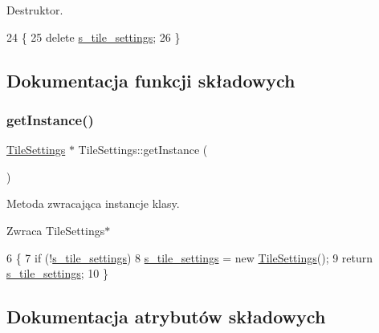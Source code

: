 Destruktor. 
\begin{DoxyCode}
24 \{
25     \textcolor{keyword}{delete} \mbox{\hyperlink{class_tile_settings_a4e06ef1c8909d1e22f82976b9b4162f0}{s\_tile\_settings}};
26 \}
\end{DoxyCode}


\subsection{Dokumentacja funkcji składowych}
\mbox{\label{class_tile_settings_a003ae6e78b97855c8592b2b4c0818914}} 
\subsubsection{\texorpdfstring{get\+Instance()}{getInstance()}}
{\footnotesize\ttfamily \mbox{\hyperlink{class_tile_settings}{Tile\+Settings}} $\ast$ Tile\+Settings\+::get\+Instance (\begin{DoxyParamCaption}{ }\end{DoxyParamCaption})\hspace{0.3cm}{\ttfamily [static]}}

Metoda zwracająca instancje klasy. \begin{DoxyReturn}{Zwraca}
Tile\+Settings$\ast$ 
\end{DoxyReturn}

\begin{DoxyCode}
6 \{
7     \textcolor{keywordflow}{if} (!\mbox{\hyperlink{class_tile_settings_a4e06ef1c8909d1e22f82976b9b4162f0}{s\_tile\_settings}})
8         \mbox{\hyperlink{class_tile_settings_a4e06ef1c8909d1e22f82976b9b4162f0}{s\_tile\_settings}} = \textcolor{keyword}{new} \mbox{\hyperlink{class_tile_settings_a5903073619b7b4bf85a2dc3548db84fe}{TileSettings}}();
9     \textcolor{keywordflow}{return} \mbox{\hyperlink{class_tile_settings_a4e06ef1c8909d1e22f82976b9b4162f0}{s\_tile\_settings}};
10 \}
\end{DoxyCode}


\subsection{Dokumentacja atrybutów składowych}
\mbox{\label{class_tile_settings_a2b24689813e0082b59df113b754778c2}} 
